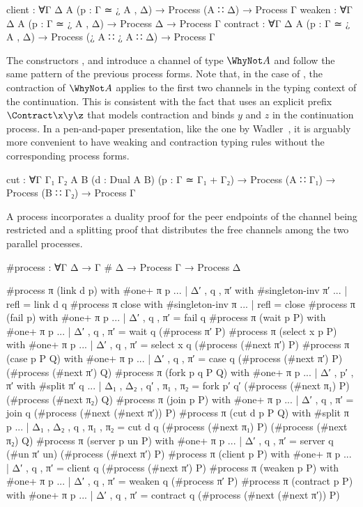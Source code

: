 \begin{AgdaAlign}
\begin{code}
   client    : ∀{Γ Δ A} (p : Γ ≃ ¿ A , Δ) → Process (A ∷ Δ) → Process Γ
   weaken    : ∀{Γ Δ A} (p : Γ ≃ ¿ A , Δ) → Process Δ → Process Γ
   contract  : ∀{Γ Δ A} (p : Γ ≃ ¿ A , Δ) → Process (¿ A ∷ ¿ A ∷ Δ) → Process Γ
\end{code}

The constructors ,
 and 
introduce a channel of type $\WhyNot A$ and follow the same pattern of the
previous process forms. Note that, in the case of
, the contraction of $\WhyNot A$ applies to
the first two channels in the typing context of the continuation. This is
consistent with the fact that \Calculus uses an explicit prefix
$\Contract\x\y\z$ that models contraction and binds $y$ and $z$ in the
continuation process. In a pen-and-paper presentation, like the one by
Wadler~\citep{Wadler14}, it is arguably more convenient to have weaking and
contraction typing rules without the corresponding process forms.

\begin{code}
   cut       : ∀{Γ Γ₁ Γ₂ A B} (d : Dual A B) (p : Γ ≃ Γ₁ + Γ₂) →
               Process (A ∷ Γ₁) → Process (B ∷ Γ₂) → Process Γ
\end{code}

A  process incorporates a duality proof for the
peer endpoints of the channel being restricted and a splitting proof that
distributes the free channels among the two parallel processes.

\end{AgdaAlign}

\begin{code}
#process : ∀{Γ Δ} → Γ # Δ → Process Γ → Process Δ
\end{code}
\begin{code}[hide]
#process π (link d p) with #one+ π p
... | Δ′ , q , π′ with #singleton-inv π′
... | refl = link d q
#process π close with #singleton-inv π
... | refl = close
#process π (fail p) with #one+ π p
... | Δ′ , q , π′ = fail q
#process π (wait p P) with #one+ π p
... | Δ′ , q , π′ = wait q (#process π′ P)
#process π (select x p P) with #one+ π p
... | Δ′ , q , π′ = select x q (#process (#next π′) P)
#process π (case p P Q) with #one+ π p
... | Δ′ , q , π′ = case q (#process (#next π′) P) (#process (#next π′) Q)
#process π (fork p q P Q) with #one+ π p
... | Δ′ , p′ , π′ with #split π′ q
... | Δ₁ , Δ₂ , q′ , π₁ , π₂ = fork p′ q′ (#process (#next π₁) P) (#process (#next π₂) Q)
#process π (join p P) with #one+ π p
... | Δ′ , q , π′ = join q (#process (#next (#next π′)) P)
#process π (cut d p P Q) with #split π p
... | Δ₁ , Δ₂ , q , π₁ , π₂ = cut d q (#process (#next π₁) P) (#process (#next π₂) Q)
#process π (server p un P) with #one+ π p
... | Δ′ , q , π′ = server q (#un π′ un) (#process (#next π′) P)
#process π (client p P) with #one+ π p
... | Δ′ , q , π′ = client q (#process (#next π′) P)
#process π (weaken p P) with #one+ π p
... | Δ′ , q , π′ = weaken q (#process π′ P)
#process π (contract p P) with #one+ π p
... | Δ′ , q , π′ = contract q (#process (#next (#next π′)) P)
\end{code}

